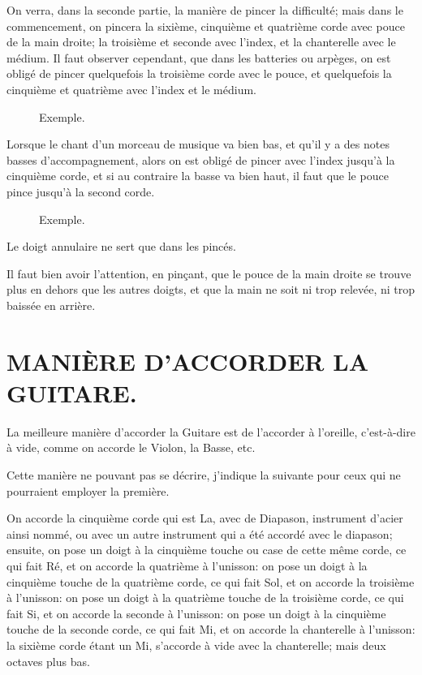 \documentclass[a4paper]{book}
\begin{document}
On verra, dans la seconde partie, la manière de pincer la difficulté; mais dans le commencement, on pincera la sixième, cinquième et quatrième corde avec pouce de la main droite; la troisième et seconde avec l'index, et la chanterelle avec le médium.  Il faut observer cependant, que dans les batteries ou arpèges, on est obligé de pincer quelquefois la troisième corde avec le pouce, et quelquefois la cinquième et quatrième avec l'index et le médium.

\begin{figure}[h]
  \centering
  \caption{Exemple.}
  \label{fig:right-hand-1}
\end{figure}

Lorsque le chant d'un morceau de musique va bien bas, et qu'il y a des notes basses d'accompagnement, alors on est obligé de pincer avec l'index jusqu'à la cinquième corde, et si au contraire la basse va bien haut, il faut que le pouce pince jusqu'à la second corde.

\begin{figure}[h]
  \centering
  \caption{Exemple.}
  \label{fig:right-hand-2}
\end{figure}

Le doigt annulaire ne sert que dans les pincés.

Il faut bien avoir l'attention, en pinçant, que le pouce de la main droite se trouve plus en dehors que les autres doigts, et que la main ne soit ni trop relevée, ni trop baissée en arrière.
\clearpage

\chapter[La manière de d'accorder]{MANIÈRE D'ACCORDER LA GUITARE.}

La meilleure manière d'accorder la Guitare est de l'accorder à l'oreille, c'est-à-dire à vide, comme on accorde le Violon, la Basse, etc.

Cette manière ne pouvant pas se décrire, j'indique la suivante pour ceux qui ne pourraient employer la première.

On accorde la cinquième corde qui est La, avec de Diapason, instrument d'acier ainsi nommé, ou avec un autre instrument qui a été accordé avec le diapason; ensuite, on pose un doigt à la cinquième touche ou case de cette même corde, ce qui fait Ré, et on accorde la quatrième à l'unisson: on pose un doigt à la cinquième touche de la quatrième corde, ce qui fait Sol, et on accorde la troisième à l'unisson: on pose un doigt à la quatrième touche de la troisième corde, ce qui fait Si, et on accorde la seconde à l'unisson: on pose un doigt à la cinquième touche de la seconde corde, ce qui fait Mi, et on accorde la chanterelle à l'unisson: la sixième corde étant un Mi, s'accorde à vide avec la chanterelle; mais deux octaves plus bas.
\end{document}
